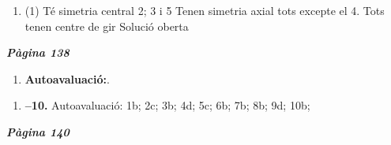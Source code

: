 \documentclass[a4paper, pdf, twoside]{book}
\begin{document}
\begin{multicols}{2}
\begin{enumerate}
 \item[\fontfamily{phv}\selectfont\color{blue}\textbf{64}. ] 
 \begin{tasks}[column-sep=1em, item-indent=1.3333em](1)
	 \task Té simetria central 2; 3 i 5
	 \task* Tenen simetria axial tots excepte el 4.
	 \task Tots tenen centre de gir
	 \task Solució oberta
\end{tasks}
 \end{enumerate}
\vspace{0.3cm}


{\textbf{\em Pàgina 138}} \hrulefill
\begin{enumerate}
\vspace{0.25cm}
 \item[$\bullet$ ] {\selectfont\color{blue}\textbf{Autoavaluació:}. }

 \end{enumerate}
\begin{enumerate}
\vspace{0.25cm}
\item[\fontfamily{phv}\selectfont\color{blue}\textbf{1. }]  \scalebox{0.6}{\simbolclau } 
\textbf {--10. } Autoavaluació: 1b; 2c; 3b; 4d; 5c; 6b; 7b; 8b; 9d; 10b;
 \end{enumerate}
\vfill\null
\columnbreak
\def\currentname{Solucions del Tema 11}
\vspace*{0.75cm}

 

\vspace*{0.4cm}
 {}
\vspace{0.3cm}


{\textbf{\em Pàgina 140}} \hrulefill
\begin{enumerate}
\vspace{0.25cm}




\end{enumerate}
\end{multicols}
\end{document}
